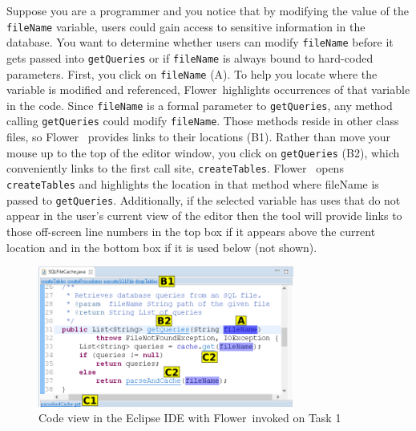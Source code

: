 \documentclass[conference]{IEEEtran}
\newcommand{\toolName}{Flower}
\begin{document}
Suppose you are a programmer and you notice that by modifying the value of the \texttt{fileName} variable, users could gain access to sensitive information in the database. 
You want to determine whether users can modify \texttt{fileName} before it gets passed into \texttt{getQueries} or if \texttt{fileName} is always bound to hard-coded parameters. 
First, you click on \texttt{fileName} (A). 
To help you locate where the variable is modified and referenced, \toolName~highlights occurrences of that variable in the code.
Since \texttt{fileName} is a formal parameter to \texttt{getQueries}, any method calling \texttt{getQueries} could modify \texttt{fileName}. 
Those methods reside in other class files, so \toolName~ provides links to their locations (B1).
Rather than move your mouse up to the top of the editor window, you click on \texttt{getQueries} (B2), which conveniently links to the first call site, \texttt{createTables}. 
\toolName~ opens \texttt{createTables} and highlights the location in that method where fileName is passed to \texttt{getQueries}.  
Additionally, if the selected variable has uses that do not appear in the user's current view of the editor then the tool will provide links to those off-screen line numbers in the top box if it appears above the current location and in the bottom box if it is used below (not shown).


\begin{figure}
	\centering
	\includegraphics[width=0.75\textwidth]{images/toolScreenshot}
	\caption{Code view in the Eclipse IDE with \toolName~invoked on Task 1}	
	\label{fig:tool} 
\end{figure}
\end{document}
